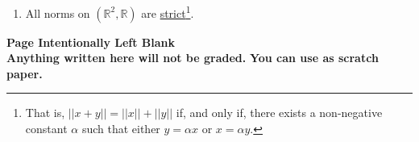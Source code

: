 \documentclass[letterpaper]{article}
\newcommand{\real}{\mathbb R}  %
\newcommand{\cp}{\mathbb C}    %
\newcommand{\ds}{\displaystyle}
\begin{document}
\begin{enumerate}
\begin{enumerate}


\item All norms on $(\real^2, \real)$ are \underline{strict}\footnote{That is, $ ||x+y|| = ||x|| + ||y||$
 if, and only if, there exists a non-negative constant $\alpha$  such that either $y = \alpha x$ or  $x = \alpha y$.}.
\end{enumerate}



\end{enumerate}

\newpage
\begin{center}
\vspace*{6cm}

{\bf \LARGE Page Intentionally Left Blank}\\
\textbf{Anything written here will not be graded.}
\vspace*{3cm}
\textbf{You can use as scratch paper.}\\

\end{center}
\end{document}
